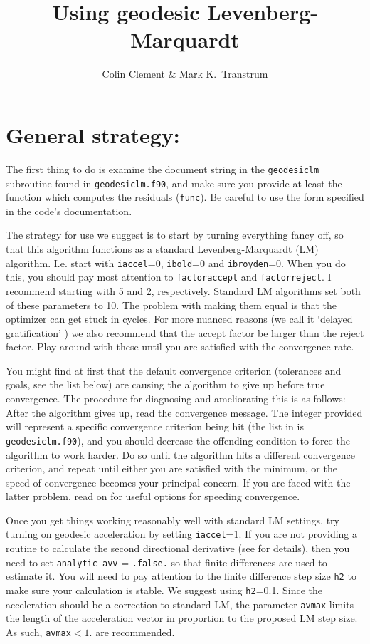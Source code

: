 \documentclass[12pt,pdf,singlespace]{article}
\title{Using geodesic Levenberg-Marquardt}
\author{Colin Clement \& Mark K.~Transtrum}
\begin{document}
{
\maketitle
}

\section{General strategy:}

The first thing to do is examine the document string in the \texttt{geodesiclm} subroutine found in \texttt{geodesiclm.f90}, and make sure you provide at least the function which computes the residuals (\texttt{func}). Be careful to use the form specified in the code's documentation.

The strategy for use we suggest is to start by turning everything fancy off, so that this algorithm functions as a standard Levenberg-Marquardt (LM) algorithm. I.e. start with \texttt{iaccel}=0, \texttt{ibold}=0 and \texttt{ibroyden}=0. When you do this, you should pay most attention to \texttt{factoraccept} and \texttt{factorreject}. I recommend starting with 5 and 2, respectively. Standard LM algorithms set both of these parameters to 10. The problem with making them equal is that the optimizer can get stuck in cycles. For more nuanced reasons (we call it `delayed gratification' \cite{transtrum2012improvements}) we also recommend that the accept factor be larger than the reject factor. Play around with these until you are satisfied with the convergence rate.

You might find at first that the default convergence criterion (tolerances and goals, see the list below) are causing the algorithm to give up before true convergence. The procedure for diagnosing and ameliorating this is as follows: After the algorithm gives up, read the convergence message. The integer provided will represent a specific convergence criterion being hit (the list in is \texttt{geodesiclm.f90}), and you should decrease the offending condition to force the algorithm to work harder. Do so until the algorithm hits a different convergence criterion, and repeat until either you are satisfied with the minimum, or the speed of convergence becomes your principal concern. If you are faced with the latter problem, read on for useful options for speeding convergence.

Once you get things working reasonably well with standard LM settings, try turning on geodesic acceleration by setting \texttt{iaccel}=1. If you are not providing a routine to calculate the second directional derivative (see \cite{transtrum2012improvements,transtrum2012geodesic, PRE83} for details), then you need to set \texttt{analytic\_avv} = \texttt{.false.} so that finite differences are used to estimate it. You will need to pay attention to the finite difference step size \texttt{h2} to make sure your calculation is stable. We suggest using \texttt{h2}=0.1. Since the acceleration should be a correction to standard LM, the parameter \texttt{avmax} limits the length of the acceleration vector in proportion to the proposed LM step size. As such, \texttt{avmax}$<1.$ are recommended.
\end{document}
